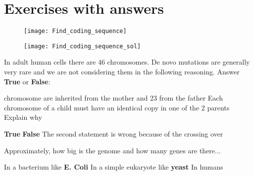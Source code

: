 \chapter{Exercises with answers}

\begin{Exercise} [
  title={Coding sequence},
  difficulty={1},
  label={excs},
  origin={G. Valle}
 ]

 \begin{figure}[H]
  \centering
  \texttt{[image: Find\_coding\_sequence]}
 \end{figure}

\end{Exercise}

\newpage

\begin{Answer} [
  ref={excs},
  number={1}
 ]

 \begin{figure}[H]
  \centering
  \texttt{[image: Find\_coding\_sequence\_sol]}
 \end{figure}

\end{Answer}



\begin{Exercise} [
  title={Chromosomes},
  difficulty={1},
  label={ex1},
  origin={G. Valle}
 ]

  In adult human cells there are 46 chromosomes. De novo mutations are generally
very rare and we are not considering them in the following reasoning.
Answer \textbf{True} or \textbf{False}:

   chromosome are inherited from the mother and 23 from the father
  \Question Each chromosome of a child must have an identical copy in one of the
2 parents
  \subQuestion Explain why
\end{Exercise}

\begin{Answer} [
   ref={ex1},
   number={1}
 ]

  \Question \textbf{True}
  \Question \textbf{False}
  \subQuestion The second statement is wrong because of the crossing over

\end{Answer}


\begin{Exercise} [
  title={Genomes and genes},
  difficulty={1},
  label={ex2},
  origin={G. Valle}
 ]

  Approximately, how big is the genome and how many genes are there...

  \Question In a bacterium like \textbf{E. Coli}
  \Question In a simple eukaryote like \textbf{yeast}
  \Question In humans

\end{Exercise}

